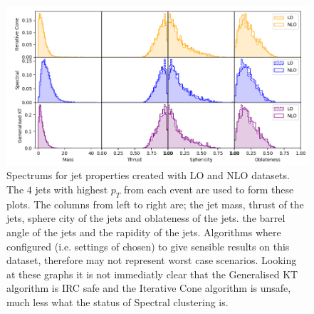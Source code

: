 \begin{figure}[htp]
    \includegraphics[width=\textwidth]{graphics/IRC_singles2}
    \caption{Spectrums for jet properties created with LO and NLO datasets.
             The \(4\) jets with highest \(p_T\) from each event are used to 
             form these plots.
             The columns from left to right are; the jet mass, 
             thrust of the jets, sphere city of the jets and oblateness of the jets.
             the barrel angle of the jets and the rapidity of the jets.
             Algorithms where configured (i.e. settings of \stoppingdeltar{} chosen)
             to give sensible results on
             this dataset, therefore may not represent worst case scenarios.
             Looking at these graphs it is not immediatly clear that the Generalised KT
             algorithm is IRC safe and the Iterative Cone algorithm is unsafe, 
         much less what the status of Spectral clustering is.}

\end{figure}
